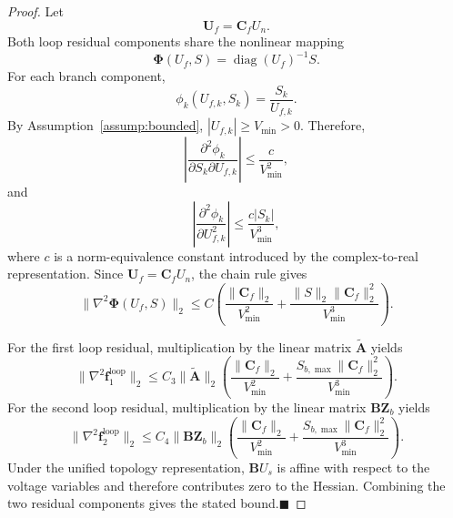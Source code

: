 \documentclass[journal]{IEEEtran}
\begin{document}
\begin{proof}
Let
\begin{equation}
\mathbf{U}_f=\mathbf{C}_fU_n.
\end{equation}
Both loop residual components share the nonlinear mapping
\begin{equation}
\boldsymbol{\Phi}(U_f,S)=\operatorname{diag}(U_f)^{-1}S.
\end{equation}
For each branch component,
\begin{equation}
\phi_k(U_{f,k},S_k)=\frac{S_k}{U_{f,k}}.
\end{equation}
By Assumption~\ref{assump:bounded}, $|U_{f,k}|\geq V_{\min}>0$. Therefore,
\begin{equation}
\left|
\frac{\partial^2 \phi_k}{\partial S_k\partial U_{f,k}}
\right|
\leq
\frac{c}{V_{\min}^{2}},
\end{equation}
and
\begin{equation}
\left|
\frac{\partial^2 \phi_k}{\partial U_{f,k}^{2}}
\right|
\leq
\frac{c|S_k|}{V_{\min}^{3}},
\end{equation}
where \(c\) is a norm-equivalence constant introduced by the complex-to-real representation. Since $\mathbf{U}_f=\mathbf{C}_fU_n$, the chain rule gives
\begin{equation}
\|\nabla^2\boldsymbol{\Phi}(U_f,S)\|_2
\leq
C
\left(
\frac{\|\mathbf{C}_f\|_2}{V_{\min}^{2}}
+
\frac{\|S\|_2\|\mathbf{C}_f\|_2^{2}}{V_{\min}^{3}}
\right).
\end{equation}

For the first loop residual, multiplication by the linear matrix $\tilde{\mathbf{A}}$ yields
\begin{equation}
\|\nabla^2 \mathbf{f}_{1}^{\mathrm{loop}}\|_2
\leq
C_3\|\tilde{\mathbf{A}}\|_2
\left(
\frac{\|\mathbf{C}_f\|_2}{V_{\min}^{2}}
+
\frac{S_{b,\max}\|\mathbf{C}_f\|_2^{2}}{V_{\min}^{3}}
\right).
\end{equation}
For the second loop residual, multiplication by the linear matrix $\mathbf{B}\mathbf{Z}_b$ yields
\begin{equation}
\|\nabla^2 \mathbf{f}_{2}^{\mathrm{loop}}\|_2
\leq
C_4\|\mathbf{B}\mathbf{Z}_b\|_2
\left(
\frac{\|\mathbf{C}_f\|_2}{V_{\min}^{2}}
+
\frac{S_{b,\max}\|\mathbf{C}_f\|_2^{2}}{V_{\min}^{3}}
\right).
\end{equation}
Under the unified topology representation, $\mathbf{B}U_s$ is affine with respect to the voltage variables and therefore contributes zero to the Hessian. Combining the two residual components gives the stated bound.\hfill $\blacksquare$
\end{proof}
\end{document}
